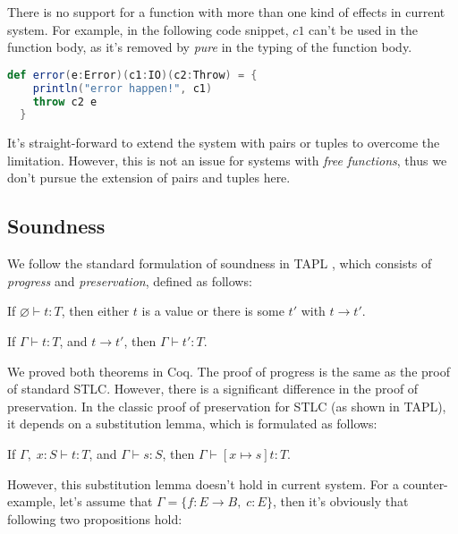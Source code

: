 There is no support for a function with more than one kind of effects
in current system. For example, in the following code snippet, $c1$
can't be used in the function body, as it's removed by \emph{pure} in
the typing of the function body.

\begin{lstlisting}[language=Scala]
  def error(e:Error)(c1:IO)(c2:Throw) = {
    println("error happen!", c1)
    throw c2 e
  }
\end{lstlisting}

It's straight-forward to extend the system with pairs or tuples to
overcome the limitation. However, this is not an issue for systems
with \emph{free functions}, thus we don't pursue the extension of
pairs and tuples here.

\subsection{Soundness}

We follow the standard formulation of soundness in TAPL
\cite{bpierce2002types}, which consists of \emph{progress} and
\emph{preservation}, defined as follows:

\begin{theorem}[Progress]
If $\varnothing \vdash t : T$, then either $t$ is a value or there is some
$t'$ with $t \longrightarrow t'$.
\end{theorem}

\begin{theorem}[Preservation]
If $\Gamma \vdash t : T$, and $t \longrightarrow t'$, then $\Gamma
\vdash t' : T$.
\end{theorem}

We proved both theorems in Coq. The proof of progress is the same as
the proof of standard STLC. However, there is a significant difference
in the proof of preservation. In the classic proof of preservation for
STLC (as shown in TAPL), it depends on a substitution lemma, which is
formulated as follows:

\begin{lemma}
If $\Gamma,\; x:S \vdash t : T$, and $\Gamma \vdash s : S$, then $\Gamma
\vdash [x \mapsto s]t : T$.
\end{lemma}

However, this substitution lemma doesn't hold in current system. For a
counter-example, let's assume that $\Gamma = \{f: E \to B,\;
  c:E\}$, then it's obviously that following two propositions hold:


